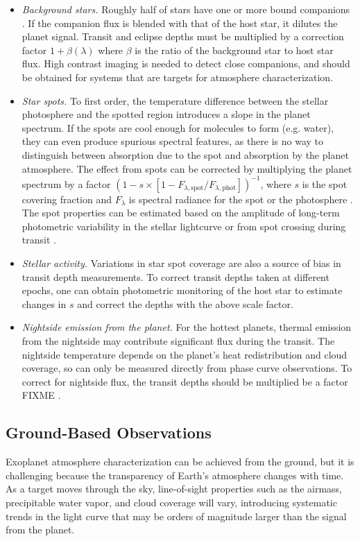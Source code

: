 \documentclass[graybox,natbib,nosecnum]{svmult}
\begin{document}
\begin{itemize}
\item{\emph{Background stars.} Roughly half of stars have one or more bound companions \citep{raghavan10}. If the companion flux is blended with that of the host star, it dilutes the planet signal. Transit and eclipse depths must be multiplied by a correction factor $1 + \beta(\lambda)$ where $\beta$ is the ratio of the background star to host star flux. High contrast imaging is needed to detect close companions, and should be obtained for systems that are targets for atmosphere characterization.}
\item{\emph{Star spots.} To first order, the temperature difference between the stellar photosphere and the spotted region introduces a slope in the planet spectrum. If the spots are cool enough for molecules to form (e.g. water), they can even produce spurious spectral features, as there is no way to distinguish between absorption due to the spot and absorption by the planet atmosphere. The effect from spots can be corrected by multiplying the planet spectrum by a factor $(1-s\times[1-F_{\lambda,\mathrm{spot}}/F_{\lambda,\mathrm{phot}}])^{-1}$, where $s$ is the spot covering fraction and $F_\lambda$ is spectral radiance for the spot or the photosphere \citep{mccullough14}. The spot properties can be estimated based on the amplitude of long-term photometric variability in the stellar lightcurve or from spot crossing during transit \citep[e.g.][]{pont08}.} 
\item{\emph{Stellar activity.} Variations in star spot coverage are also a source of bias in transit depth measurements. To correct transit depths taken at different epochs, one can obtain photometric monitoring of the host star to estimate changes in $s$ and correct the depths with the above scale factor.} 
\item{\emph{Nightside emission from the planet.} For the hottest planets, thermal emission from the nightside may contribute significant flux during the transit. The nightside temperature depends on the planet's heat redistribution and cloud coverage, so can only be measured directly from phase curve observations. To correct for nightside flux, the transit depths should be multiplied be a factor FIXME \citep{kipping10}.} 
\end{itemize}

\subsection{Ground-Based Observations}
Exoplanet atmosphere characterization can be achieved from the ground, but it is challenging because
the transparency of Earth's atmosphere changes with time.  As a target moves through the sky, line-of-sight properties such as the airmass, precipitable water vapor, and cloud coverage will vary, introducing systematic trends in the light curve that may be orders of magnitude larger than the signal from the planet. 
\end{document}
